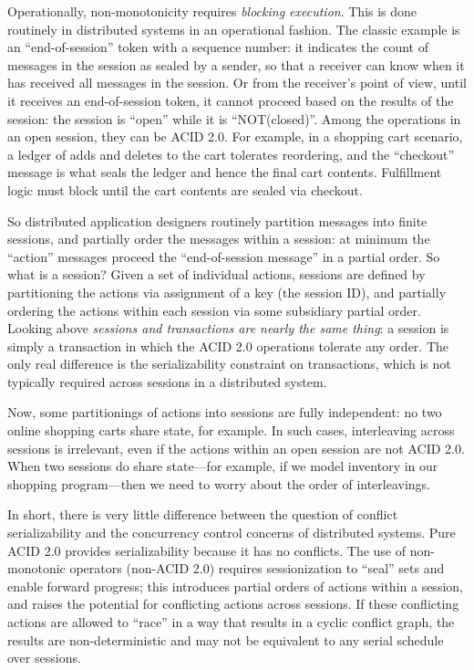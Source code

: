 \documentclass{sig-alternate}
\begin{document}
Operationally, non-monotonicity requires \emph{blocking execution}. This is done routinely in distributed systems in an operational fashion.  The classic example is an ``end-of-session'' token with a sequence number: it indicates the count of messages in the session as sealed by a sender, so that a receiver can know when it has received all messages in the session.  Or from the receiver's point of view, until it receives an end-of-session token, it cannot proceed based on the results of the session: the session is ``open'' while it is ``NOT(closed)''.  Among the operations in an open session, they can be ACID 2.0.  For example, in a shopping cart scenario, a ledger of adds and deletes to the cart tolerates reordering, and the ``checkout'' message is what seals the ledger and hence the final cart contents.  Fulfillment logic must block until the cart contents are sealed via checkout.

So distributed application designers routinely partition messages into finite sessions, and partially order the messages within a session: at minimum the ``action'' messages proceed the ``end-of-session message'' in a partial order.  So what is a session?  Given a set of individual actions, sessions are defined by partitioning the actions via assignment of a key (the session ID), and partially ordering the actions within each session via some subsidiary partial order.  Looking above \emph{sessions and transactions are nearly the same thing}: a session is simply a transaction in which the ACID 2.0 operations tolerate any order.  The only real difference is the serializability constraint on transactions, which is not typically required across sessions in a distributed system.

Now, some partitionings of actions into sessions are fully independent: no two online shopping carts share state, for example.  In such cases, interleaving across sessions is irrelevant, even if the actions within an open session are not ACID 2.0.  When two sessions do share state---for example, if we model inventory in our shopping program---then we need to worry about the order of interleavings.  

In short, there is very little difference between the question of conflict serializability and the concurrency control concerns of distributed systems.  Pure ACID 2.0 provides serializability because it has no conflicts.  The use of non-monotonic operators (non-ACID 2.0) requires sessionization to ``seal'' sets and enable forward progress; this introduces partial orders of actions within a session, and raises the potential for conflicting actions across sessions.  If these conflicting actions are allowed to ``race'' in a way that results in a cyclic conflict graph, the results are non-deterministic and may not be equivalent to any serial schedule over sessions.
\end{document}
